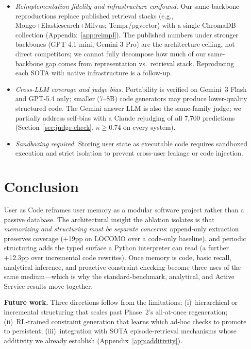 \begin{itemize}[leftmargin=*]
\item \emph{Reimplementation fidelity and infrastructure confound.} Our same-backbone reproductions replace published retrieval stacks (e.g., Mongo+Elasticsearch+Milvus; Tempr/pgvector) with a single ChromaDB collection (Appendix~\ref{app:reimpl}). The published numbers under stronger backbones (GPT-4.1-mini, Gemini-3 Pro) are the architecture ceiling, not direct competitors; we cannot fully decompose how much of our same-backbone gap comes from representation vs.\ retrieval stack. Reproducing each SOTA with native infrastructure is a follow-up.
\item \emph{Cross-LLM coverage and judge bias.} Portability is verified on Gemini~3 Flash and GPT-5.4 only; smaller (7--8B) code generators may produce lower-quality structured code. The Gemini answer LLM is also the same-family judge; we partially address self-bias with a Claude rejudging of all 7{,}700 predictions (Section~\ref{sec:judge-check}, $\kappa \geq 0.74$ on every system).
\item \emph{Sandboxing required.} Storing user state as executable code requires sandboxed execution and strict isolation to prevent cross-user leakage or code injection.
\end{itemize}


\section{Conclusion}

User as Code reframes user memory as a modular software project rather than a passive database. The architectural insight the ablation isolates is that \emph{memorizing and structuring must be separate concerns}: append-only extraction preserves coverage (+19pp on LOCOMO over a code-only baseline), and periodic structuring adds the typed surface a Python interpreter can read (a further +12.3pp over incremental code rewrites). Once memory is code, basic recall, analytical inference, and proactive constraint checking become three uses of the same medium---which is why the standard-benchmark, analytical, and Active Service results move together.

\textbf{Future work.} Three directions follow from the limitations: (i)~hierarchical or incremental structuring that scales past Phase~2's all-at-once regeneration; (ii)~RL-trained constraint generation that learns which ad-hoc checks to promote to persistent; (iii)~integration with SOTA episode-retrieval mechanisms whose additivity we already establish (Appendix~\ref{app:additivity}).

